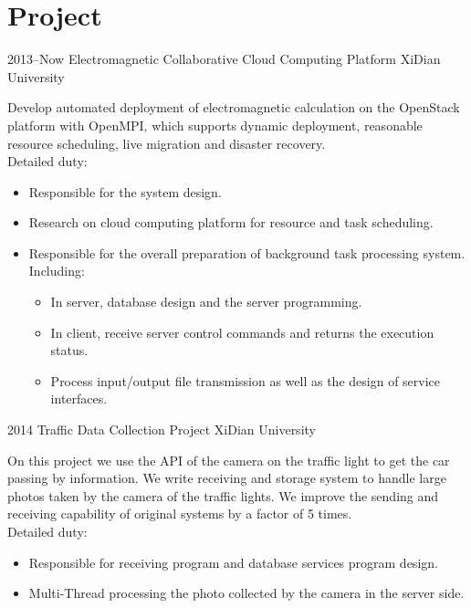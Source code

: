 \documentclass[]{friggeri-cv} %
\begin{document}

\section{Project}

\begin{entrylist}
\entry
{2013--Now}
{Electromagnetic Collaborative Cloud Computing Platform}
{XiDian University}
{Develop automated deployment of electromagnetic calculation on the OpenStack platform with OpenMPI, which supports dynamic deployment, reasonable resource scheduling, live migration and disaster recovery.\\
Detailed duty:
\begin{itemize}
\item Responsible for the system design.
\item Research on cloud computing platform for resource and task scheduling.
\item Responsible for the overall preparation of background task processing system.\\Including:
  \begin{itemize}
    \item In server, database design and the server programming.
    \item In client, receive server control commands and returns the execution status.
    \item Process input/output file transmission as well as the design of service interfaces.
  \end{itemize}
\end{itemize}}
\entry
{2014}
{Traffic Data Collection Project}
{XiDian University}
{On this project we use the API of the camera on the traffic light to get the car passing by information. 
We write receiving and storage system to handle large photos taken by the camera of the traffic lights. We improve the sending and receiving capability of original systems by a factor of 5 times.\\
Detailed duty:
\begin{itemize}
  \item Responsible for receiving program and database services program design.
  \item Multi-Thread processing the photo collected by the camera in the server side.

\end{itemize}}
\end{entrylist}
\end{document}
